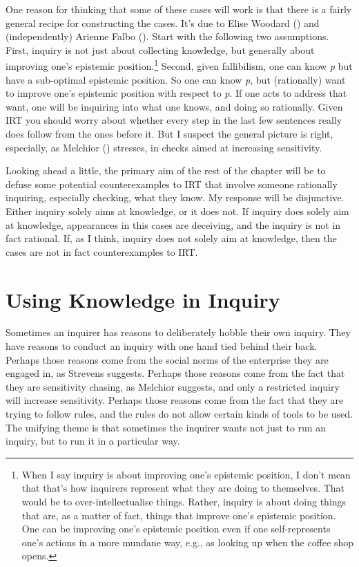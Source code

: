 \documentclass[
  10pt,
  letterpaper,
  twoside]{scrbook}
\begin{document}
One reason for thinking that some of these cases will work is that there
is a fairly general recipe for constructing the cases. It's due to Elise
Woodard () and (independently) Arienne
Falbo (). Start with the following two
assumptions. First, inquiry is not just about collecting knowledge, but
generally about improving one's epistemic position.\footnote{When I say
  inquiry is about improving one's epistemic position, I don't mean that
  that's how inquirers represent what they are doing to themselves. That
  would be to over-intellectualise things. Rather, inquiry is about
  doing things that are, as a matter of fact, things that improve one's
  epistemic position. One can be improving one's epistemic position even
  if one self-represents one's actions in a more mundane way, e.g., as
  looking up when the coffee shop opens.} Second, given fallibilism, one
can know \emph{p} but have a sub-optimal epistemic position. So one can
know \emph{p}, but (rationally) want to improve one's epistemic position
with respect to \emph{p}. If one acts to address that want, one will be
inquiring into what one knows, and doing so rationally. Given IRT you
should worry about whether every step in the last few sentences really
does follow from the ones before it. But I suspect the general picture
is right, especially, as Melchior ()
stresses, in checks aimed at increasing sensitivity.

Looking ahead a little, the primary aim of the rest of the chapter will
be to defuse some potential counterexamples to IRT that involve someone
rationally inquiring, especially checking, what they know. My response
will be disjunctive. Either inquiry solely aims at knowledge, or it does
not. If inquiry does solely aim at knowledge, appearances in this cases
are deceiving, and the inquiry is not in fact rational. If, as I think,
inquiry does not solely aim at knowledge, then the cases are not in fact
counterexamples to IRT.

\section{Using Knowledge in Inquiry}\label{sec-irtinquiry}

Sometimes an inquirer has reasons to deliberately hobble their own
inquiry. They have reasons to conduct an inquiry with one hand tied
behind their back. Perhaps those reasons come from the social norms of
the enterprise they are engaged in, as Strevens suggests. Perhaps those
reasons come from the fact that they are sensitivity chasing, as
Melchior suggests, and only a restricted inquiry will increase
sensitivity. Perhaps those reasons come from the fact that they are
trying to follow rules, and the rules do not allow certain kinds of
tools to be used. The unifying theme is that sometimes the inquirer
wants not just to run an inquiry, but to run it in a particular way.
\end{document}
